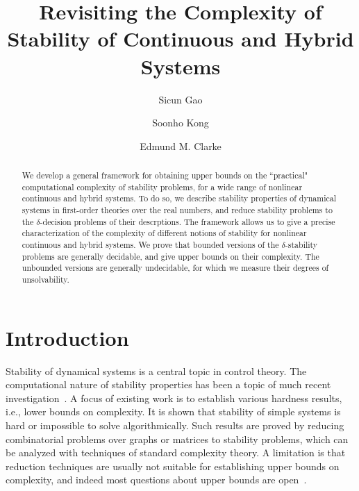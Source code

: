 \documentclass[10pt]{article}
\title{\LARGE \bf Revisiting the Complexity of Stability of Continuous and Hybrid Systems}
\author{Sicun Gao \and Soonho Kong \and Edmund M. Clarke}
\theoremstyle{plain}
\theoremstyle{definition}
\begin{document}
\maketitle
\thispagestyle{empty}
\pagestyle{empty}


\begin{abstract}
We develop a general framework for obtaining upper bounds on the ``practical" computational complexity of stability problems, for a wide range of nonlinear continuous and hybrid systems. To do so, we describe stability properties of dynamical systems in first-order theories over the real numbers, and reduce stability problems to the $\delta$-decision problems of their descrptions. The framework allows us to give a precise characterization of the complexity of different notions of stability for nonlinear continuous and hybrid systems. We prove that bounded versions of the $\delta$-stability problems are generally decidable, and give upper bounds on their complexity. The unbounded versions are generally undecidable, for which we measure their degrees of unsolvability. 
\end{abstract}

\section{Introduction}

Stability of dynamical systems is a central topic in control theory. The computational nature of stability properties has been a topic of much recent investigation~\cite{DBLP:journals/corr/AhmadiP13,DBLP:journals/automatica/BlondelT99,DBLP:journals/automatica/BlondelT00,AAAthesis,DBLP:conf/hybrid/PrabhakarV13,DBLP:journals/corr/abs-1210-7420}. A focus of existing work is to establish various hardness results, i.e., lower bounds on complexity. It is shown that stability of simple systems is hard or impossible to solve algorithmically. Such results are proved by reducing combinatorial problems over graphs or matrices to stability problems, which can be analyzed with techniques of standard complexity theory. A limitation is that reduction techniques are usually not suitable for establishing upper bounds on complexity, and indeed most questions about upper bounds are open~\cite{AAAthesis}. 
\end{document}
